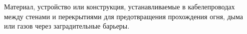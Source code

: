 Материал, устройство или конструкция, устанавливаемые в
кабелепроводах между стенами и перекрытиями для предотвращения
прохождения огня, дыма или газов через заградительные барьеры.